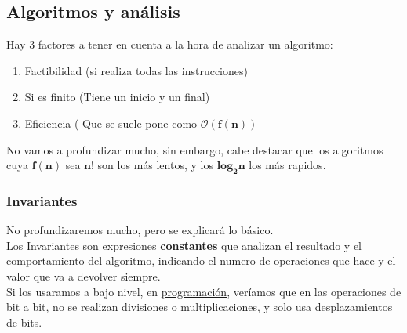\subsection{Algoritmos y análisis}
\noindent Hay 3 factores a tener en cuenta a la hora de analizar un algoritmo:
\begin{enumerate}
        \item Factibilidad (si realiza todas las instrucciones)
        \item Si es finito (Tiene un inicio y un final)
        \item Eficiencia ( Que se suele pone como \(\mathbf{\mathcal{O}(f(n))}\)
\end{enumerate}
\noindent No vamos a profundizar mucho, sin embargo, cabe destacar que los algoritmos cuya \(\mathbf{f(n)}\) sea \(\mathbf{n!}\) son los más lentos, y los \(\mathbf{log_{2}{n}}\) los más rapidos.
\subsubsection{Invariantes}
\noindent No profundizaremos mucho, pero se explicará lo básico.\\ Los Invariantes son expresiones \textbf{constantes} que analizan el resultado y el comportamiento del algoritmo, indicando el numero de operaciones que hace y el valor que va a devolver siempre.\\ Si los usaramos a bajo nivel, en \underline{programación}, veríamos que en las operaciones de bit a bit, no se realizan divisiones o multiplicaciones, y solo usa desplazamientos de bits.
